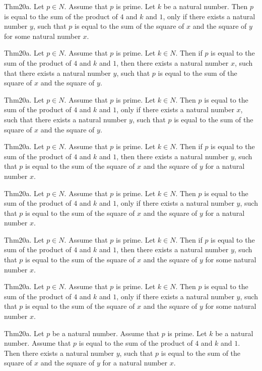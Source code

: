 \documentclass{article}
\begin{document}
Thm20a. Let $p \in N$. Assume that $p$ is prime. Let $k$ be a natural number. Then $p$ is equal to the sum of the product of $4$ and $k$ and $1$, only if there exists a natural number $y$, such that $p$ is equal to the sum of the square of $x$ and the square of $y$ for some natural number $x$.

Thm20a. Let $p \in N$. Assume that $p$ is prime. Let $k \in N$. Then if $p$ is equal to the sum of the product of $4$ and $k$ and $1$, then there exists a natural number $x$, such that there exists a natural number $y$, such that $p$ is equal to the sum of the square of $x$ and the square of $y$.

Thm20a. Let $p \in N$. Assume that $p$ is prime. Let $k \in N$. Then $p$ is equal to the sum of the product of $4$ and $k$ and $1$, only if there exists a natural number $x$, such that there exists a natural number $y$, such that $p$ is equal to the sum of the square of $x$ and the square of $y$.

Thm20a. Let $p \in N$. Assume that $p$ is prime. Let $k \in N$. Then if $p$ is equal to the sum of the product of $4$ and $k$ and $1$, then there exists a natural number $y$, such that $p$ is equal to the sum of the square of $x$ and the square of $y$ for a natural number $x$.

Thm20a. Let $p \in N$. Assume that $p$ is prime. Let $k \in N$. Then $p$ is equal to the sum of the product of $4$ and $k$ and $1$, only if there exists a natural number $y$, such that $p$ is equal to the sum of the square of $x$ and the square of $y$ for a natural number $x$.

Thm20a. Let $p \in N$. Assume that $p$ is prime. Let $k \in N$. Then if $p$ is equal to the sum of the product of $4$ and $k$ and $1$, then there exists a natural number $y$, such that $p$ is equal to the sum of the square of $x$ and the square of $y$ for some natural number $x$.

Thm20a. Let $p \in N$. Assume that $p$ is prime. Let $k \in N$. Then $p$ is equal to the sum of the product of $4$ and $k$ and $1$, only if there exists a natural number $y$, such that $p$ is equal to the sum of the square of $x$ and the square of $y$ for some natural number $x$.

Thm20a. Let $p$ be a natural number. Assume that $p$ is prime. Let $k$ be a natural number. Assume that $p$ is equal to the sum of the product of $4$ and $k$ and $1$. Then there exists a natural number $y$, such that $p$ is equal to the sum of the square of $x$ and the square of $y$ for a natural number $x$.
\end{document}
